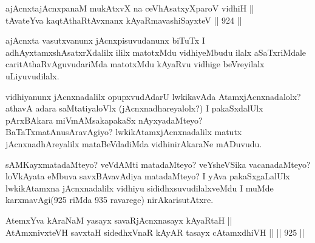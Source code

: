

\begin{shl}
ajAcnxtajAcnxpanaM mukAtxvX na ceVhAsatxyXparoV vidhiH || \\
tAvateYva kaqtAthaRtAvxnanx kAyaRmavashiSayxteV \hfill || 924 ||  
\end{shl}

\begin{artha}
ajAcnxta vasutxvanunx jAcnxpisuvudanunx biTuTx I adhAyxtamxshAsatxrXdalilx ililx matotxMdu vidhiyeMbudu ilalx aSaTxriMdale caritAthaRvAguvudariMda matotxMdu kAyaRvu vidhige beVreyilalx uLiyuvudilalx.
\end{artha}

\begin{artha}
vidhiyanunx jAcnxnadalilx opupxvudAdarU lwkikavAda AtamxjAcnxnadalolx? athavA adara saMtatiyaloVlx (jAcnxnadhareyalolx?) I pakaSxdalUlx pArxBAkara miVmAMsakapakaSx nAyxyadaMteyo? BaTaTxmatAnusAravAgiyo? lwkikAtamxjAcnxnadalilx matutx jAcnxnadhAreyalilx mataBeVdadiMda vidhinirAkaraNe mADuvudu.
\end{artha}

\begin{artha}
sAMKayxmatadaMteyo? veVdAMti matadaMteyo? veYsheVSika vacanadaMteyo? loVkAyata eMbuva savxBAvavAdiya matadaMteyo? I yAva pakaSxgaLalUlx lwkikAtamxna jAcnxnadalilx vidhiyu sididhxsuvudilalxveMdu I muMde karxmavAgi(925 riMda 935 ravarege) nirAkarisutAtxre.
\end{artha}



\begin{shl}
AtemxYva kAraNaM yasayx savaRjAcnxnasayx kAyaRtaH || \\
AtAmxnivxteVH savxtaH sidedhxVnaR kAyAR tasayx cA\s \s tamxdhiVH ||  \hfill || 925 ||  
\end{shl}

